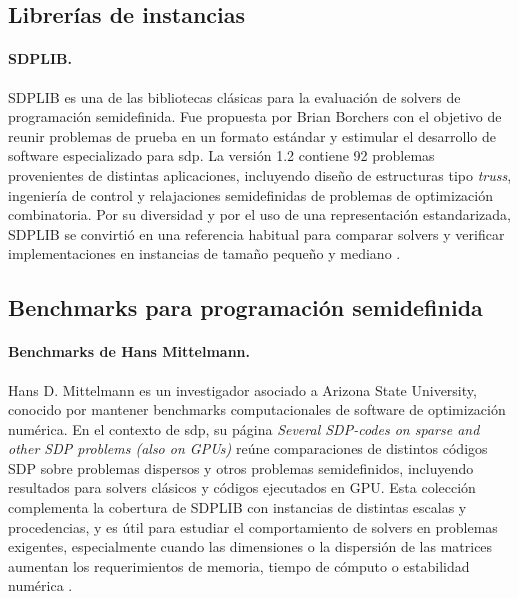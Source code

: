 \subsection{Librerías de instancias}
\label{subsec:librerias_instancias_sdp}

\paragraph{SDPLIB.}
\label{subsec:benchmark_sdplib}

SDPLIB es una de las bibliotecas clásicas para la evaluación de solvers de programación
semidefinida. Fue propuesta por Brian Borchers con el objetivo de reunir problemas de prueba en
un formato estándar y estimular el desarrollo de software especializado para \acrshort{sdp}. La
versión 1.2 contiene 92 problemas provenientes de distintas aplicaciones, incluyendo diseño de
estructuras tipo \textit{truss}, ingeniería de control y relajaciones semidefinidas de problemas de
optimización combinatoria. Por su diversidad y por el uso de una representación estandarizada,
SDPLIB se convirtió en una referencia habitual para comparar solvers y verificar implementaciones
en instancias de tamaño pequeño y mediano \cite{borchersSDPLIB12Library1999}.

\newpage
\subsection{Benchmarks para programación semidefinida}
\label{sec:benchmarks_sdp}

\paragraph{Benchmarks de Hans Mittelmann.}
\label{subsec:benchmark_mittelmann}

Hans D. Mittelmann es un investigador asociado a Arizona State University, conocido por mantener
benchmarks computacionales de software de optimización numérica. En el contexto de
\acrshort{sdp}, su página \textit{Several SDP-codes on sparse and other SDP problems (also on
GPUs)} reúne comparaciones de distintos códigos SDP sobre problemas dispersos y otros problemas
semidefinidos, incluyendo resultados para solvers clásicos y códigos ejecutados en GPU. Esta
colección complementa la cobertura de SDPLIB con instancias de distintas escalas y procedencias,
y es útil para estudiar el comportamiento de solvers en problemas exigentes, especialmente
cuando las dimensiones o la dispersión de las matrices aumentan los requerimientos de memoria,
tiempo de cómputo o estabilidad numérica \cite{PlatoasueduFtpSparse_sdphtml}.

